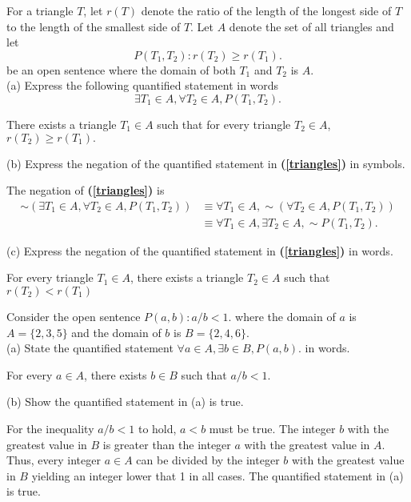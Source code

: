 \documentclass[12pt]{article}
\newenvironment{problem}[2][Problem]{\begin{trivlist}
		\item[\hskip \labelsep {\bfseries #1}\hskip \labelsep {\bfseries #2.}]}{\end{trivlist}}
\newenvironment{solution}[2][Solution]{\begin{trivlist}
		\item[\hskip \labelsep {\bfseries #1}\hskip \labelsep {\bfseries #2.}]}{\end{trivlist}}
\begin{document}
\begin{problem}{77}
	For a triangle $T$, let $r(T)$ denote the ratio of the length of the longest side of $T$ to the length of the smallest side of $T$. Let $A$ denote the set of all triangles and let
	\begin{equation*}
		P(T_1,T_2) : r(T_2)\geq r(T_1).
	\end{equation*}
	be an open sentence where the domain of both $T_1$ and $T_2$ is $A$.\\
	
	(a) Express the following quantified statement in words
	\begin{equation}
		\label{triangles}
		\exists T_1\in A, \forall T_2 \in A, P(T_1,T_2).
	\end{equation}
	\begin{solution}{a}
		There exists a triangle $T_1 \in A$ such that for every triangle $T_2 \in A$, $r(T_2) \geq r(T_1).$
	\end{solution}

	(b) Express the negation of the quantified statement in \textbf{(\ref{triangles})} in symbols.
	\begin{solution}{b}
		The negation of \textbf{(\ref{triangles})} is
		\begin{align*}
			\sim(\exists T_1\in A, \forall T_2 \in A, P(T_1,T_2)) &\equiv \forall T_1\in A, \sim(\forall T_2 \in A, P(T_1,T_2))\\
			& \equiv \forall T_1 \in A, \exists T_2 \in A, \sim P(T_1,T_2).
		\end{align*}
	\end{solution}

	(c) Express the negation of the quantified statement in \textbf{(\ref{triangles})} in words.
	\begin{solution}{c}
		For every triangle $T_1 \in A$, there exists a triangle $T_2 \in A$ such that $r(T_2) < r(T_1)$
	\end{solution}
\end{problem}

\begin{problem}{78}
	Consider the open sentence $P(a,b):a/b < 1.$ where the domain of $a$ is $A = \{2,3,5\}$ and the domain of $b$ is $B = \{2,4,6\}$.\\
	
	(a) State the quantified statement $\forall a \in A, \exists b \in B, P(a,b).$ in words.
	\begin{solution}{a}
		For every $a \in A$, there exists $b \in B$ such that $a/b < 1$.
	\end{solution}

	(b) Show the quantified statement in (a) is true.
	\begin{solution}{b}
		For the inequality $a/b < 1$ to hold, $a < b$ must be true. The integer $b$ with the greatest value in $B$ is greater than the integer $a$ with the greatest value in $A$. Thus, every integer $a\in A$ can be divided by the integer $b$ with the greatest value in $B$ yielding an integer lower that 1 in all cases. The quantified statement in (a) is true.
	\end{solution}
\end{problem}
\end{document}
